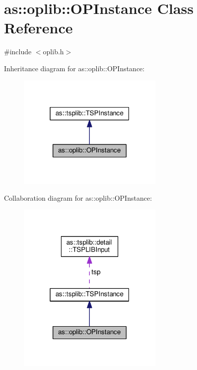 \hypertarget{classas_1_1oplib_1_1OPInstance}{}\section{as\+:\+:oplib\+:\+:O\+P\+Instance Class Reference}
\label{classas_1_1oplib_1_1OPInstance}


{\ttfamily \#include $<$oplib.\+h$>$}



Inheritance diagram for as\+:\+:oplib\+:\+:O\+P\+Instance\+:
\nopagebreak
\begin{figure}[H]
\begin{center}
\leavevmode
\includegraphics[width=199pt]{classas_1_1oplib_1_1OPInstance__inherit__graph}
\end{center}
\end{figure}


Collaboration diagram for as\+:\+:oplib\+:\+:O\+P\+Instance\+:
\nopagebreak
\begin{figure}[H]
\begin{center}
\leavevmode
\includegraphics[width=199pt]{classas_1_1oplib_1_1OPInstance__coll__graph}
\end{center}
\end{figure}
